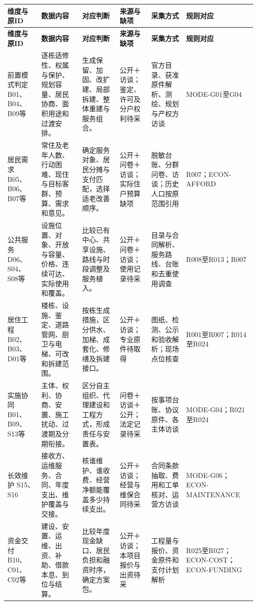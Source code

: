 \documentclass[UTF8,11pt,fontset=windows]{ctexart}
\begin{document}
\begin{landscape}
\small
\begin{longtable}{@{}L{21mm}L{55mm}L{50mm}L{34mm}L{45mm}L{32mm}@{}}
\toprule
\textbf{维度与原ID} & \textbf{数据内容} & \textbf{对应判断} & \textbf{来源与缺项} & \textbf{采集方式} & \textbf{规则对应}\\\midrule\endfirsthead
\toprule\textbf{维度与原ID} & \textbf{数据内容} & \textbf{对应判断} & \textbf{来源与缺项} & \textbf{采集方式} & \textbf{规则对应}\\\midrule\endhead
前置模式判定
\newline B01、B04、B09等 & 逐栋适修性、权属与保护、规划容量、居民协商、面积用途和过渡安排。 & 生成保留、加固、改扩建、局部拆建、整体重建与服务组合。 & 公开＋访谈；鉴定、许可及分户权利待采 & 官方目录、获准原件解析、测绘、规划与产权方访谈 & MODE-G01至G04\\
居民需求
\newline B05、B06、B07等 & 常住及老年人数、行动困难、现住与目标客群、预算、需求和意见。 & 确定服务对象、居民分摊与支付匹配，选择适老改善顺序。 & 公开＋问卷＋访谈；实际住户预算缺项 & 脱敏台账、分群问卷、访谈；历史人口按原范围引用 & R007；ECON-AFFORD\\
公共服务
\newline D06、S04、S08等 & 设施位置、对象、开放与容量、价格、连续可达、实际使用和覆盖。 & 比较已有中心、共享设施、路线与时段调整及服务植入。 & 公开＋问卷＋访谈；使用记录待采 & 目录与合同解析、服务路线、台账和去重使用调查 & R008至R013；R007\\
居住工程
\newline B02、B03、D01等 & 楼栋、设施、鉴定、道路管网、厨卫与电梯、可改和拆建范围。 & 按栋生成措施，区分供水、加梯、成套化、修缮及拆建接口。 & 公开＋访谈；专业原件待取得 & 图纸、检测、公示和验收解析；现场点位核查 & R001至R007；R014至R024\\
实施协同
\newline B01、B09、S13等 & 主体、权利、协商、安置、施工扰动、过渡期及分期衔接。 & 区分自主组织、代理建设和工程方式，形成责任与安置表。 & 问卷＋访谈＋公开；法定记录待采 & 按事项台账、协议原件、各主体访谈 & MODE-G04；R021至R024\\
长效维护
\newline S15、S16 & 接收方、运维服务、合同、年度支出、维护覆盖与交接。 & 核谁维护、谁收费、经营净额能覆盖多少持续支出。 & 公开＋访谈；经营与维保合同待采 & 合同条款抽取、费用和工单核对、运营方访谈 & MODE-G06；ECON-MAINTENANCE\\
资金交付
\newline B10、C01、C02等 & 建设、安置、运维、出资、补助、借款本息、到位与结算。 & 比较年度现金缺口、居民负担和融资时序，确定方案包。 & 公开＋访谈；本项目报价与出资待采 & 工程量与报价、资金原件和支付计划解析 & R025至R027；ECON-COST；ECON-FUNDING\\

\end{longtable}
\end{landscape}
\end{document}
